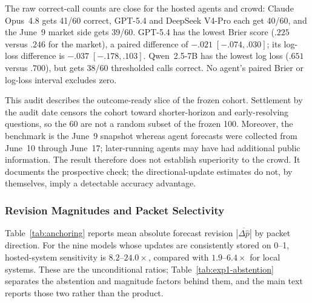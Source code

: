 \begin{center}
\begin{minipage}{\linewidth}
\centering
{}
\label{tab:exp1-resolved-outcomes}
\scriptsize
\resizebox{\linewidth}{!}{%

}
\end{minipage}
\end{center}

The raw correct-call counts are close for the hosted agents and crowd:
Claude Opus~4.8 gets 41/60 correct, GPT-5.4 and DeepSeek V4-Pro each get
40/60, and the June~9 market side gets 39/60.  GPT-5.4 has the lowest Brier
score (\(.225\) versus \(.246\) for the market), a paired difference of
\(-.021\;[-.074,.030]\); its log-loss difference is
\(-.037\;[-.178,.103]\).  Qwen~2.5-7B has the lowest log loss (\(.651\)
versus \(.700\)), but gets 38/60 thresholded calls correct.  No agent's paired
Brier or log-loss interval excludes zero.

This audit describes the outcome-ready slice of the frozen cohort. Settlement by
the audit date censors the cohort toward shorter-horizon and early-resolving
questions, so the 60 are not a random subset of the frozen 100.  Moreover, the
benchmark is the June~9 snapshot whereas agent forecasts were collected from
June~10 through June~17; later-running agents may have had additional public
information.  The result therefore does not establish superiority to the crowd.
It documents the prospective check; the directional-update estimates do not, by
themselves, imply a detectable accuracy advantage.

\subsubsection{Revision Magnitudes and Packet Selectivity}
Table~\ref{tab:anchoring} reports mean absolute forecast revision
\(\overline{|\Delta\hat p|}\) by packet direction.  For the nine models whose updates
are consistently stored on 0--1, hosted-system sensitivity is $8.2$--$24.0\times$,
compared with $1.9$--$6.4\times$ for local systems. These are the unconditional
ratios; Table~\ref{tab:exp1-abstention} separates the abstention and magnitude
factors behind them, and the main text reports those two rather than the product.

